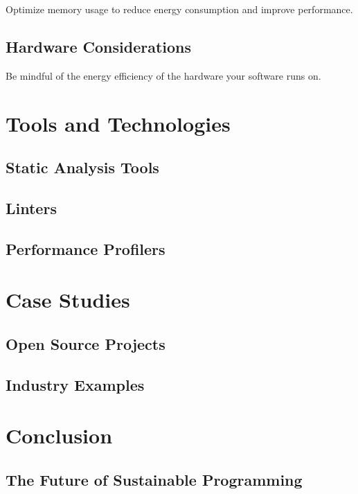 \documentclass{book}
\begin{document}
Optimize memory usage to reduce energy consumption and improve performance.

\section{Hardware Considerations}

Be mindful of the energy efficiency of the hardware your software runs on.


\chapter{Tools and Technologies}
\section{Static Analysis Tools}
\section{Linters}
\section{Performance Profilers}

\chapter{Case Studies}
\section{Open Source Projects}
\section{Industry Examples}

\chapter{Conclusion}

\section{The Future of Sustainable Programming}
\end{document}
